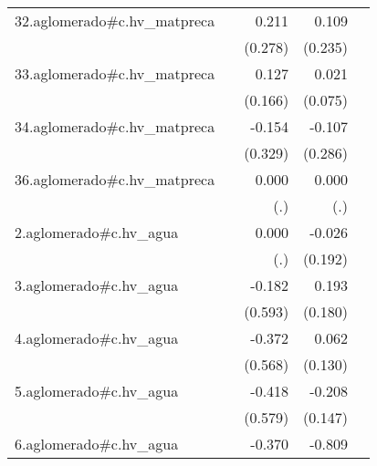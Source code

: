 {\begin{longtable}{l*{4}{D{.}{.}{-1}}}
\addlinespace
32.aglomerado#c.hv\_matpreca&                     &       0.211         &       0.109         &                     \\
            &                     &     (0.278)         &     (0.235)         &                     \\
\addlinespace
33.aglomerado#c.hv\_matpreca&                     &       0.127         &       0.021         &                     \\
            &                     &     (0.166)         &     (0.075)         &                     \\
\addlinespace
34.aglomerado#c.hv\_matpreca&                     &      -0.154         &      -0.107         &                     \\
            &                     &     (0.329)         &     (0.286)         &                     \\
\addlinespace
36.aglomerado#c.hv\_matpreca&                     &       0.000         &       0.000         &                     \\
            &                     &         (.)         &         (.)         &                     \\
\addlinespace
2.aglomerado#c.hv\_agua&                     &       0.000         &      -0.026         &                     \\
            &                     &         (.)         &     (0.192)         &                     \\
\addlinespace
3.aglomerado#c.hv\_agua&                     &      -0.182         &       0.193         &                     \\
            &                     &     (0.593)         &     (0.180)         &                     \\
\addlinespace
4.aglomerado#c.hv\_agua&                     &      -0.372         &       0.062         &                     \\
            &                     &     (0.568)         &     (0.130)         &                     \\
\addlinespace
5.aglomerado#c.hv\_agua&                     &      -0.418         &      -0.208         &                     \\
            &                     &     (0.579)         &     (0.147)         &                     \\
\addlinespace
6.aglomerado#c.hv\_agua&                     &      -0.370         &      -0.809\sym{***}&                     \\

\end{longtable}}

